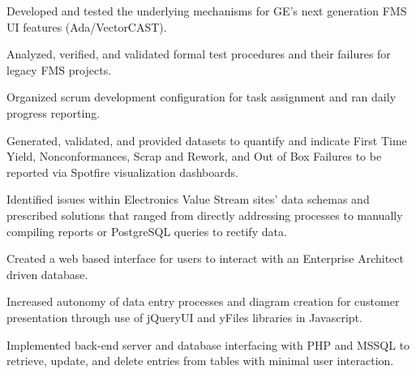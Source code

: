 \documentclass[]{deedy-resume-openfont}
\begin{document}
\begin{tightemize}
\item Developed and tested the underlying mechanisms for GE's next generation FMS UI features (Ada/VectorCAST).
\item Analyzed, verified, and validated formal test procedures and their failures for legacy FMS projects.
\item Organized scrum development configuration for task assignment and ran daily progress reporting.
\end{tightemize}

\sectionsep


\location{}
\begin{tightemize}
\item  Generated, validated, and provided datasets to quantify and indicate First Time Yield, Nonconformances, Scrap and Rework, and Out of Box Failures to be reported via Spotfire visualization dashboards.
\item Identified issues within Electronics Value Stream sites' data schemas and prescribed solutions that ranged from directly addressing processes to manually compiling reports or PostgreSQL queries to rectify data.
\end{tightemize}

\location{}
\begin{tightemize}
\item Created a web based interface for users to interact with an Enterprise Architect driven database.
\item Increased autonomy of data entry processes and diagram creation for customer presentation through use of jQueryUI and yFiles libraries in Javascript.
\item Implemented back-end server and database interfacing with PHP and MSSQL to retrieve, update, and delete entries from tables with minimal user interaction.
\end{tightemize}
\end{document}
